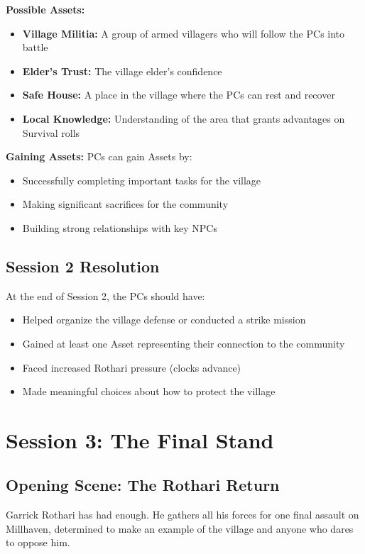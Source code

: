 \documentclass[11pt]{article}
\begin{document}
\textbf{Possible Assets:}
\begin{itemize}
\item \textbf{Village Militia:} A group of armed villagers who will follow the PCs into battle
\item \textbf{Elder's Trust:} The village elder's confidence
\item \textbf{Safe House:} A place in the village where the PCs can rest and recover
\item \textbf{Local Knowledge:} Understanding of the area that grants advantages on Survival rolls
\end{itemize}

\textbf{Gaining Assets:} PCs can gain Assets by:
\begin{itemize}
\item Successfully completing important tasks for the village
\item Making significant sacrifices for the community
\item Building strong relationships with key NPCs
\end{itemize}

\subsection{Session 2 Resolution}

At the end of Session 2, the PCs should have:
\begin{itemize}
\item Helped organize the village defense or conducted a strike mission
\item Gained at least one Asset representing their connection to the community
\item Faced increased Rothari pressure (clocks advance)
\item Made meaningful choices about how to protect the village
\end{itemize}

\section{Session 3: The Final Stand}

\subsection{Opening Scene: The Rothari Return}

Garrick Rothari has had enough. He gathers all his forces for one final assault on Millhaven, determined to make an example of the village and anyone who dares to oppose him.
\end{document}
